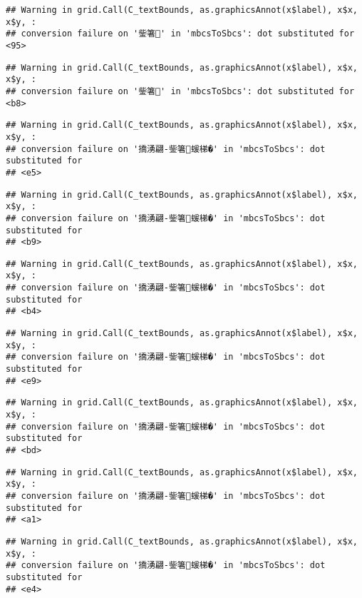\documentclass[
]{article}
\begin{document}
\begin{verbatim}
## Warning in grid.Call(C_textBounds, as.graphicsAnnot(x$label), x$x, x$y, :
## conversion failure on '鈭箸' in 'mbcsToSbcs': dot substituted for <95>
\end{verbatim}

\begin{verbatim}
## Warning in grid.Call(C_textBounds, as.graphicsAnnot(x$label), x$x, x$y, :
## conversion failure on '鈭箸' in 'mbcsToSbcs': dot substituted for <b8>
\end{verbatim}

\begin{verbatim}
## Warning in grid.Call(C_textBounds, as.graphicsAnnot(x$label), x$x, x$y, :
## conversion failure on '撟湧翩-鈭箸蝯梯�' in 'mbcsToSbcs': dot substituted for
## <e5>
\end{verbatim}

\begin{verbatim}
## Warning in grid.Call(C_textBounds, as.graphicsAnnot(x$label), x$x, x$y, :
## conversion failure on '撟湧翩-鈭箸蝯梯�' in 'mbcsToSbcs': dot substituted for
## <b9>
\end{verbatim}

\begin{verbatim}
## Warning in grid.Call(C_textBounds, as.graphicsAnnot(x$label), x$x, x$y, :
## conversion failure on '撟湧翩-鈭箸蝯梯�' in 'mbcsToSbcs': dot substituted for
## <b4>
\end{verbatim}

\begin{verbatim}
## Warning in grid.Call(C_textBounds, as.graphicsAnnot(x$label), x$x, x$y, :
## conversion failure on '撟湧翩-鈭箸蝯梯�' in 'mbcsToSbcs': dot substituted for
## <e9>
\end{verbatim}

\begin{verbatim}
## Warning in grid.Call(C_textBounds, as.graphicsAnnot(x$label), x$x, x$y, :
## conversion failure on '撟湧翩-鈭箸蝯梯�' in 'mbcsToSbcs': dot substituted for
## <bd>
\end{verbatim}

\begin{verbatim}
## Warning in grid.Call(C_textBounds, as.graphicsAnnot(x$label), x$x, x$y, :
## conversion failure on '撟湧翩-鈭箸蝯梯�' in 'mbcsToSbcs': dot substituted for
## <a1>
\end{verbatim}

\begin{verbatim}
## Warning in grid.Call(C_textBounds, as.graphicsAnnot(x$label), x$x, x$y, :
## conversion failure on '撟湧翩-鈭箸蝯梯�' in 'mbcsToSbcs': dot substituted for
## <e4>
\end{verbatim}
\end{document}
